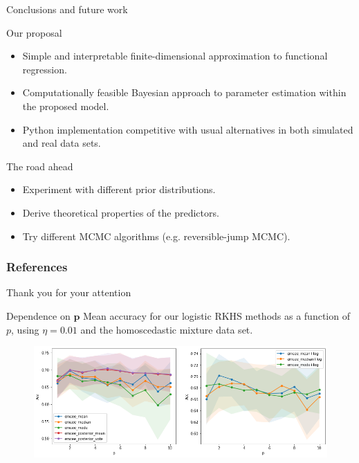 \documentclass[9pt, english, professionalfonts]{beamer}
\begin{document}
\begin{frame}{Conclusions and future work}

 \begin{alertblock}{Our proposal}
   \begin{itemize}
     \item Simple and interpretable finite-dimensional approximation to functional regression.
     \item Computationally feasible Bayesian approach to parameter estimation within the proposed model.
     \item Python implementation competitive with usual alternatives in both simulated and real data sets.
   \end{itemize}
 \end{alertblock}

\pause

 \begin{exampleblock}{The road ahead}
   \begin{itemize}
     \item Experiment with different prior distributions.
     \item Derive theoretical properties of the predictors.
     \item Try different MCMC algorithms (e.g. reversible-jump MCMC).
   \end{itemize}
 \end{exampleblock}

\end{frame}

\begin{frame}
    \frametitle{References}
    \nocite{*}
    \printbibliography[heading=none]
\end{frame}

\appendix

\begin{frame}[standout]
  Thank you for your attention
\end{frame}




\begin{frame}{Dependence on \(\bm p\)}
Mean accuracy for our logistic RKHS methods as a function of \(p\), using \(\eta=0.01\) and the homoscedastic mixture data set.

\vspace{1em}

\begin{figure}
  \centering
  \includegraphics[width=.95\textwidth]{mixture_dependence_acc_p}
  \caption*{}
\end{figure}
\end{frame}
\end{document}
